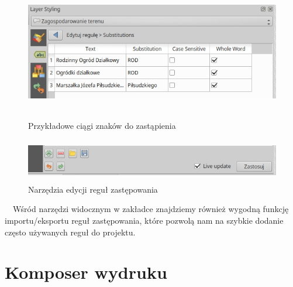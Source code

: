 \documentclass[12pt,a4paper]{book}
\begin{document}
\begin{center}
\begin{figure}
\includegraphics[width=15.69cm,height=5.927cm]{007-subs.jpg}
\caption{Przykładowe ciągi znaków do zastąpienia}
\end{figure}
\end{center}
\begin{center}
\begin{figure}
\includegraphics[width=15.478cm,height=1.879cm]{007-subs-rule.jpg}
\caption{Narzędzia edycji reguł zastępowania}
\end{figure}
\end{center}
\ \ Wśród narzędzi widocznym w zakładce znajdziemy również wygodną funkcję importu/eksportu reguł zastępowania, które pozwolą nam na szybkie dodanie często używanych reguł do projektu.

\chapter{Komposer wydruku}
\end{document}
